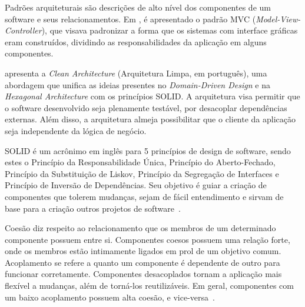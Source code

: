 Padrões arquiteturais são descrições de alto nível dos componentes de um software e seus relacionamentos.
Em , é apresentado o padrão MVC (\emph{Model-View-Controller}), que visava padronizar a forma que os sistemas com interface gráficas eram construídos, dividindo as responsabilidades da aplicação em alguns componentes.

 apresenta a \emph{Clean Architecture} (Arquitetura Limpa, em português), uma abordagem que unifica as ideias presentes no \emph{Domain-Driven Design} \cite{ddd-book} e na \emph{Hexagonal Architecture} \cite{hexagonal-arch} com os princípios SOLID.
A arquitetura visa permitir que o software desenvolvido seja plenamente testável, por desacoplar dependências externas.
Além disso, a arquitetura almeja possibilitar que o cliente da aplicação seja independente da lógica de negócio.

SOLID é um acrônimo em inglês para 5 princípios de design de software, sendo estes o Princípio da Responsabilidade Única, Princípio do Aberto-Fechado, Princípio da Substituição de Liskov, Princípio da Segregação de Interfaces e Princípio de Inversão de Dependências.
Seu objetivo é guiar a criação de componentes que tolerem mudanças, sejam de fácil entendimento e sirvam de base para a criação outros projetos de software~\cite{clean-arch-book}.

Coesão diz respeito ao relacionamento que os membros de um determinado componente possuem entre si.
Componentes coesos possuem uma relação forte, onde os membros estão intimamente ligados em prol de um objetivo comum.
Acoplamento se refere a quanto um componente é dependente de outro para funcionar corretamente.
Componentes desacoplados tornam a aplicação mais flexível a mudanças, além de torná-los reutilizáveis.
Em geral, componentes com um baixo acoplamento possuem alta coesão, e vice-versa~.